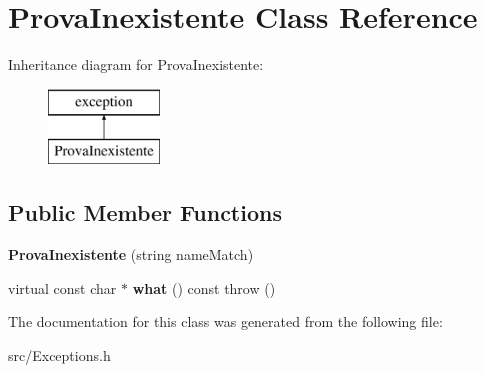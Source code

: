 \hypertarget{class_prova_inexistente}{}\section{Prova\+Inexistente Class Reference}
\label{class_prova_inexistente}
Inheritance diagram for Prova\+Inexistente\+:\begin{figure}[H]
\begin{center}
\leavevmode
\includegraphics[height=2.000000cm]{class_prova_inexistente}
\end{center}
\end{figure}
\subsection*{Public Member Functions}
\begin{DoxyCompactItemize}
\item 
\hypertarget{class_prova_inexistente_a28509bb7a080cf2d487ab1061ff5f539}{}{\bfseries Prova\+Inexistente} (string name\+Match)\label{class_prova_inexistente_a28509bb7a080cf2d487ab1061ff5f539}

\item 
\hypertarget{class_prova_inexistente_ae8a129d3e086d1e43f4797918037db46}{}virtual const char $\ast$ {\bfseries what} () const   throw ()\label{class_prova_inexistente_ae8a129d3e086d1e43f4797918037db46}

\end{DoxyCompactItemize}


The documentation for this class was generated from the following file\+:\begin{DoxyCompactItemize}
\item 
src/Exceptions.\+h\end{DoxyCompactItemize}
